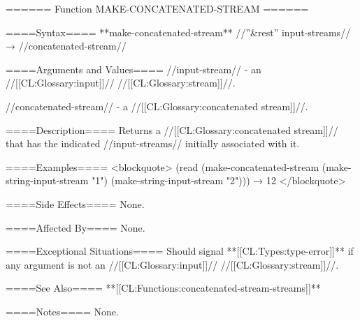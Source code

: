 ====== Function MAKE-CONCATENATED-STREAM ======

====Syntax====
**make-concatenated-stream** //''&rest'' input-streams// → //concatenated-stream//

====Arguments and Values====
//input-stream// - an //[[CL:Glossary:input]]// //[[CL:Glossary:stream]]//.

//concatenated-stream// - a //[[CL:Glossary:concatenated stream]]//.

====Description====
Returns a //[[CL:Glossary:concatenated stream]]// that has the indicated //input-streams// initially associated with it.

====Examples====
<blockquote> (read (make-concatenated-stream (make-string-input-stream "1") (make-string-input-stream "2"))) → 12 </blockquote>

====Side Effects====
None.

====Affected By====
None.

====Exceptional Situations====
Should signal **[[CL:Types:type-error]]** if any argument is not an //[[CL:Glossary:input]]// //[[CL:Glossary:stream]]//.

====See Also====
**[[CL:Functions:concatenated-stream-streams]]**

====Notes====
None.

